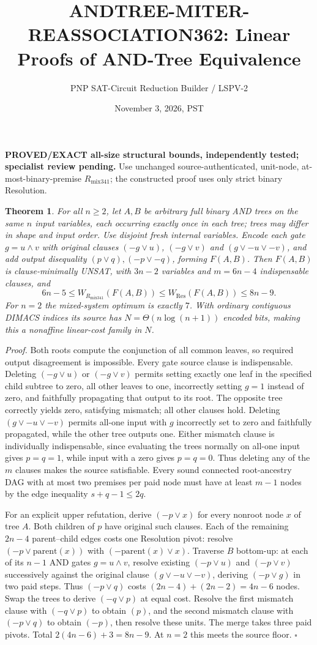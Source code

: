 \documentclass[11pt]{article}
\title{ANDTREE-MITER-REASSOCIATION362: Linear Proofs of AND-Tree Equivalence}
\author{PNP SAT-Circuit Reduction Builder / LSPV-2}
\date{November 3, 2026, PST}
\newtheorem{theorem}{Theorem}
\begin{document}
\maketitle
\noindent\textbf{PROVED/EXACT all-size structural bounds, independently tested; specialist review pending.}
Use unchanged source-authenticated, unit-node, at-most-binary-premise $R_{\mathrm{mix341}}$; the constructed proof uses only strict binary Resolution.
\begin{theorem}
For all $n\ge2$, let $A,B$ be arbitrary full binary AND trees on the same $n$ input variables, each occurring exactly once in each tree; trees may differ in shape and input order. Use disjoint fresh internal variables. Encode each gate $g=u\land v$ with original clauses $(-g\lor u)$, $(-g\lor v)$ and $(g\lor-u\lor-v)$, and add output disequality $(p\lor q),(-p\lor-q)$, forming $F(A,B)$. Then $F(A,B)$ is clause-minimally UNSAT, with $3n-2$ variables and $m=6n-4$ indispensable clauses, and
\[
\boxed{6n-5\le W_{R_{\mathrm{mix341}}}(F(A,B))\le W_{\mathrm{Res}}(F(A,B))\le8n-9.}
\]
For $n=2$ the mixed-system optimum is exactly $7$. With ordinary contiguous DIMACS indices its source has $N=\Theta(n\log(n+1))$ encoded bits, making this a nonaffine linear-cost family in $N$.
\end{theorem}
\noindent\emph{Proof.}
Both roots compute the conjunction of all common leaves, so required output disagreement is impossible. Every gate source clause is indispensable. Deleting $(-g\lor u)$ or $(-g\lor v)$ permits setting exactly one leaf in the specified child subtree to zero, all other leaves to one, incorrectly setting $g=1$ instead of zero, and faithfully propagating that output to its root. The opposite tree correctly yields zero, satisfying mismatch; all other clauses hold. Deleting $(g\lor-u\lor-v)$ permits all-one input with $g$ incorrectly set to zero and faithfully propagated, while the other tree outputs one. Either mismatch clause is individually indispensable, since evaluating the trees normally on all-one input gives $p=q=1$, while input with a zero gives $p=q=0$. Thus deleting any of the $m$ clauses makes the source satisfiable. Every sound connected root-ancestry DAG with at most two premises per paid node must have at least $m-1$ nodes by the edge inequality $s+q-1\le2q$.

For an explicit upper refutation, derive $(-p\lor x)$ for every nonroot node $x$ of tree $A$. Both children of $p$ have original such clauses. Each of the remaining $2n-4$ parent--child edges costs one Resolution pivot: resolve $(-p\lor\mathrm{parent}(x))$ with $(-\mathrm{parent}(x)\lor x)$. Traverse $B$ bottom-up: at each of its $n-1$ AND gates $g=u\land v$, resolve existing $(-p\lor u)$ and $(-p\lor v)$ successively against the original clause $(g\lor-u\lor-v)$, deriving $(-p\lor g)$ in two paid steps. Thus $(-p\lor q)$ costs $(2n-4)+(2n-2)=4n-6$ nodes. Swap the trees to derive $(-q\lor p)$ at equal cost. Resolve the first mismatch clause with $(-q\lor p)$ to obtain $(p)$, and the second mismatch clause with $(-p\lor q)$ to obtain $(-p)$, then resolve these units. The merge takes three paid pivots. Total $2(4n-6)+3=8n-9$. At $n=2$ this meets the source floor. $\square$
\end{document}
